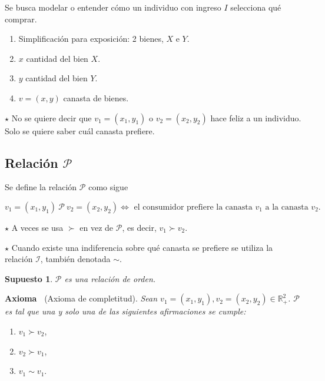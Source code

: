 \documentclass{report}
\newcounter{axiom}
\newcounter{theorem}[chapter]
\newenvironment{axiom}[1]{\refstepcounter{axiom}\noindent\setlength{\parskip}{0pt}\textbf{Axioma~\theaxiom} (#1).\em}{}
\newenvironment{obs}{$\star$ }{}
\newtheorem*{supuesto}{Supuesto}
\begin{document}
Se busca modelar o entender cómo un individuo con ingreso $I$ selecciona qué comprar.

\begin{enumerate}
    \item Simplificación para exposición: 2 bienes, $X$ e $Y$.
    \item $x$ cantidad del bien $X$.
    \item $y$ cantidad del bien $Y$.
    \item $v = \left(x, y\right)$ canasta de bienes.
\end{enumerate}

\begin{obs}
    No se quiere decir que $v_1=\left(x_1,y_1\right)$ o $v_2=\left(x_2, y_2\right)$ hace feliz a un individuo. Solo se quiere saber cuál canasta prefiere.
\end{obs}

\subsection {Relación $\mathcal{P}$}

Se define la relación $\mathcal{P}$ como sigue

$$v_1=\left(x_1, y_1\right)\ \mathcal{P}\ v_2=\left(x_2, y_2\right) \Leftrightarrow\text{ el consumidor prefiere la canasta $v_1$ a la canasta $v_2$.}$$

\begin{obs} 
    A veces se usa $\succ$ en vez de $\mathcal{P}$, es decir, $v_1\succ v_2$.
\end{obs}

\begin{obs} 
    Cuando existe una indiferencia sobre qué canasta se prefiere se utiliza la relación $\mathcal{I}$, también denotada $\sim$.
\end{obs}

\begin{supuesto}
    $\mathcal{P}$ es una relación de orden.
\end{supuesto}

\begin{axiom}{Axioma de completitud}
    Sean $v_1 = \left(x_1, y_1\right), v_2 = \left(x_2, y_2\right) \in \mathbb{R}_+^2$. $\mathcal{P}$ es tal que una y solo una de las siguientes afirmaciones se cumple:
\begin{enumerate}
    \item $v_1\succ v_2$,
    \item $v_2\succ v_1$,
    \item $v_1\sim v_1$.
\end{enumerate}
\end{axiom}
\end{document}

